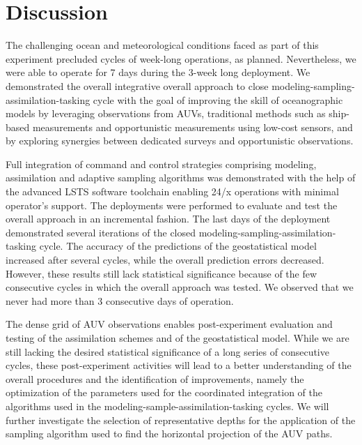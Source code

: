 \section{Discussion}



The challenging ocean and meteorological conditions faced as part of
this experiment precluded cycles of week-long operations, as
planned. Nevertheless, we were able to operate for 7 days during the
3-week long deployment. We demonstrated the overall integrative
overall approach to close modeling-sampling-assimilation-tasking cycle
with the goal of improving the skill of oceanographic models by
leveraging observations from AUVs, traditional methods such as
ship-based measurements and opportunistic measurements using low-cost
sensors, and by exploring synergies between dedicated surveys and
opportunistic observations.

Full integration of command and control strategies comprising modeling,
assimilation and adaptive sampling algorithms was demonstrated with the
help of the advanced LSTS software toolchain enabling 24/x operations
with minimal operator’s support. The deployments were performed to
evaluate and test the overall approach in an incremental fashion. The
last days of the deployment demonstrated several iterations of the
closed modeling-sampling-assimilation-tasking cycle. The accuracy of the
predictions of the geostatistical model increased after several cycles,
while the overall prediction errors decreased. However, these results
still lack statistical significance because of the few consecutive
cycles in which the overall approach was tested. We observed that we
never had more than 3 consecutive days of operation.

The dense grid of AUV observations enables post-experiment evaluation
and testing of the assimilation schemes and of the geostatistical model.
While we are still lacking the desired statistical significance of a
long series of consecutive cycles, these post-experiment activities will
lead to a better understanding of the overall procedures and the
identification of improvements, namely the optimization of the
parameters used for the coordinated integration of the algorithms used
in the modeling-sample-assimilation-tasking cycles. We will further
investigate the selection of representative depths for the application
of the sampling algorithm used to find the horizontal projection of the
AUV paths.


